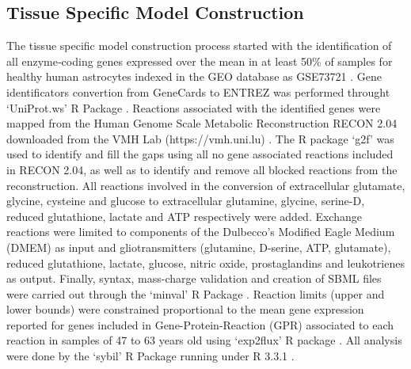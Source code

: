 \subsection*{Tissue Specific Model Construction}
The tissue specific model construction process started with the identification of all enzyme‐coding genes expressed over the mean in at least 50\% of samples for healthy human astrocytes indexed in the GEO database \cite{Edgar2002} as GSE73721 \citep{Zhang2016}. Gene identificators convertion from GeneCards\cite{rebhan1997genecards} to ENTREZ \cite{maglott2005entrez} was performed throught `UniProt.ws' R Package \cite{Carlson2016}. Reactions associated with the identified genes were mapped from the Human Genome Scale  Metabolic Reconstruction RECON 2.04 downloaded from the VMH Lab (https://vmh.uni.lu) \cite{thiele2013community}. The R package `g2f' \cite{G2F} was used to identify and fill the gaps using all no gene associated reactions included in RECON 2.04, as well as to identify and remove all blocked reactions  from the reconstruction. All reactions involved in the conversion of extracellular glutamate, glycine, cysteine and glucose to extracellular glutamine, glycine, serine-D, reduced glutathione, lactate and ATP respectively were added. Exchange reactions were limited to components of the Dulbecco's Modified Eagle Medium (DMEM) as input and gliotransmitters (glutamine, D-serine, ATP, glutamate), reduced glutathione, lactate, glucose, nitric oxide, prostaglandins and leukotrienes as output. Finally, syntax, mass-charge validation and creation of SBML files were carried out through the `minval' R Package \cite{MINVAL}. Reaction limits (upper and lower bounds) were constrained proportional to the mean gene expression reported for genes included in Gene-Protein-Reaction (GPR) \cite{Thiele2010} associated to each reaction in samples of 47 to 63 years old using `exp2flux' R package \cite{EXP2FLUX}. All analysis were done by the `sybil' \cite{Gelius-Dietrich2013} R Package running under R 3.3.1 \cite{RCoreTeam2016}.
